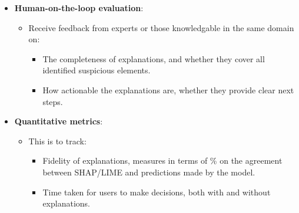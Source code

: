 \begin{itemize}
  \item \textbf{Human-on-the-loop evaluation}:
  \begin{itemize}
    \item Receive feedback from experts or those knowledgable in the same domain on:
    \begin{itemize}
      \item The completeness of explanations, and whether they cover all identified suspicious elements.
      \item How actionable the explanations are, whether they provide clear next steps.
    \end{itemize}
  \end{itemize}
  \item \textbf{Quantitative metrics}:
  \begin{itemize}
    \item This is to track:
    \begin{itemize}
      \item Fidelity of explanations, measures in terms of \% on the agreement between SHAP/LIME and predictions made by the model.
      \item Time taken for users to make decisions, both with and without explanations.
    \end{itemize}
  \end{itemize}
\end{itemize}
